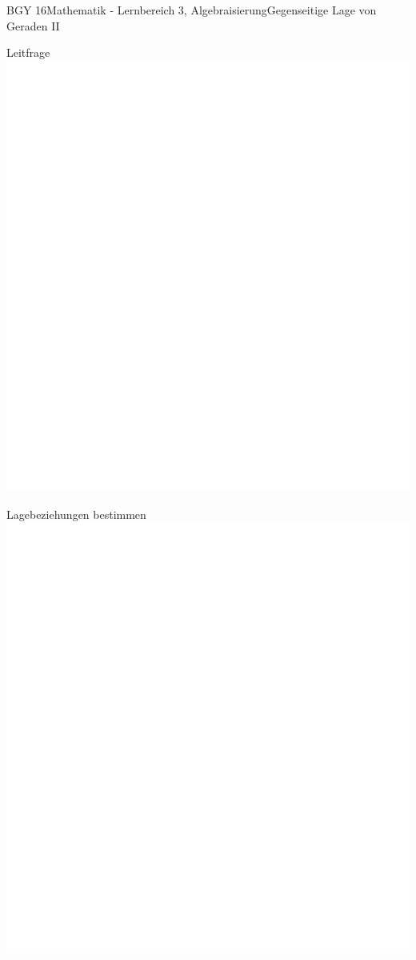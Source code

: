\documentclass[oneside,openany,headings=optiontotoc,11pt,numbers=noenddot]{scrreprt}
\begin{document}
\begin{worksheet}{BGY 16}{Mathematik - Lernbereich 3, Algebraisierung}{Gegenseitige Lage von Geraden II}
\begin{framed}
		\end{framed}
		\begin{framed}
			\noindent
			\tiny{\color{codegray}Leitfrage}\\
			\includegraphics[scale=0.05]{../empty.jpg}
		\end{framed}
		\begin{framed}
			\noindent
			\tiny{\color{codegray}Lagebeziehungen bestimmen}\\
			\includegraphics[scale=0.65]{../empty.jpg}\\

\end{framed}
\end{worksheet}
\end{document}
